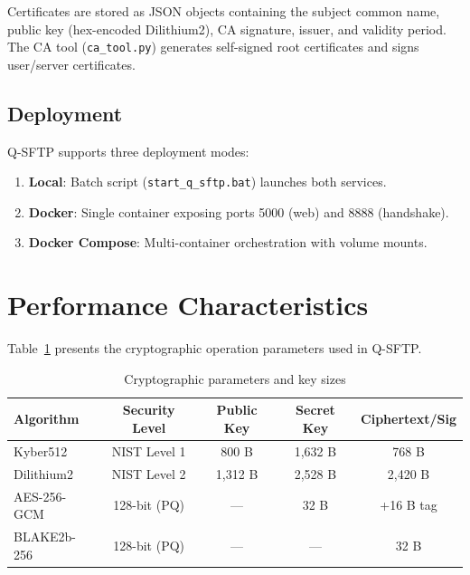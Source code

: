 \documentclass[12pt, a4paper]{article}
\begin{document}
Certificates are stored as JSON objects containing the subject common name, public key (hex-encoded Dilithium2), CA signature, issuer, and validity period. The CA tool (\texttt{ca\_tool.py}) generates self-signed root certificates and signs user/server certificates.

\subsection{Deployment}

Q-SFTP supports three deployment modes:

\begin{enumerate}[label=\arabic*., itemsep=2pt]
    \item \textbf{Local}: Batch script (\texttt{start\_q\_sftp.bat}) launches both services.
    \item \textbf{Docker}: Single container exposing ports 5000 (web) and 8888 (handshake).
    \item \textbf{Docker Compose}: Multi-container orchestration with volume mounts.
\end{enumerate}

\section{Performance Characteristics}
\label{sec:evaluation}

Table~\ref{tab:crypto} presents the cryptographic operation parameters used in Q-SFTP.

\begin{table}[H]
    \centering
    \caption{Cryptographic parameters and key sizes}
    \label{tab:crypto}
    \begin{tabular}{lcccc}
        \toprule
        \textbf{Algorithm} & \textbf{Security Level} & \textbf{Public Key} & \textbf{Secret Key} & \textbf{Ciphertext/Sig} \\
        \midrule
        Kyber512 & NIST Level 1 & 800 B & 1,632 B & 768 B \\
        Dilithium2 & NIST Level 2 & 1,312 B & 2,528 B & 2,420 B \\
        AES-256-GCM & 128-bit (PQ) & — & 32 B & +16 B tag \\
        BLAKE2b-256 & 128-bit (PQ) & — & — & 32 B \\
        \bottomrule
    \end{tabular}
\end{table}
\end{document}

